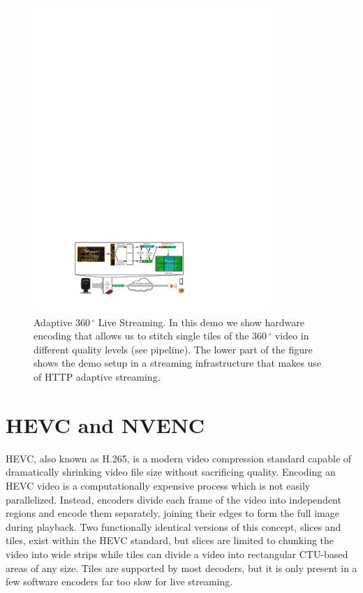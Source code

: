 \renewcommand{\figurename}{Fig.}
\begin{figure}[t]
	\centering
	\includegraphics[width=0.8\textwidth]{figures/Streaming_scenario_v3.pdf}
	\caption{Adaptive $360\,^{\circ}$ Live Streaming. In this demo we show hardware encoding that allows us to stitch single tiles of the $360\,^{\circ}$ video in different quality levels (see pipeline). The lower part of the figure shows the demo setup in a streaming infrastructure that makes use of HTTP adaptive streaming.}
	\label{fig:pipeline}
\end{figure}

\section{HEVC and NVENC} \label{hevc}

HEVC, also known as H.265, is a modern video compression standard capable of dramatically shrinking video file size without sacrificing quality. Encoding an HEVC video is a computationally expensive process which is not easily parallelized. Instead, encoders divide each frame of the video into independent regions and encode them separately, joining their edges to form the full image during playback. Two functionally identical versions of this concept, slices and tiles, exist within the HEVC standard, but slices are limited to chunking the video into wide strips while tiles can divide a video into rectangular CTU-based areas of any size. Tiles are supported by most decoders, but it is only present in a few software encoders far too slow for live streaming.

